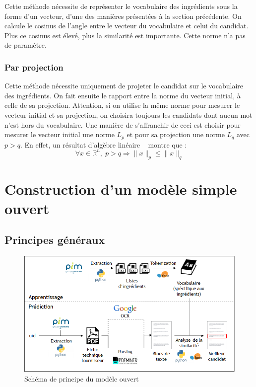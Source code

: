             Cette méthode nécessite de représenter le vocabulaire des ingrédients sous la forme d'un vecteur, d'une des manières présentées à la section précédente.
            On calcule le cosinus de l'angle entre le vecteur du vocabulaire et celui du candidat.
            Plus ce cosinus est élevé, plus la similarité est importante.
            Cette norme n'a pas de paramètre.

            \subsection{Par projection}

            Cette méthode nécessite uniquement de projeter le candidat sur le vocabulaire des ingrédients.
            On fait ensuite le rapport entre la norme du vecteur initial, à celle de sa projection.
            Attention, si on utilise la même norme pour mesurer le vecteur initial et sa projection, on choisira toujours les candidats dont aucun mot n'est hors du vocabulaire.
            Une manière de s'affranchir de ceci est choisir pour mesurer le vecteur initial une norme $L_{p}$ et pour sa projection une norme $L_{q}$ avec $p > q$.
            En effet, un résultat d'algèbre linéaire ~\cite{lpnorms} montre que :
            \[\forall x \in \mathbb{R}^{n}, \; p > q \Rightarrow \lVert x \rVert_{p} \leqslant \lVert x \rVert_{q}\]


    \chapter{Construction d'un modèle simple \og ouvert \fg}
        
        \section{Principes généraux}

            \begin{figure}[htbp]
                \begin{center}
                \includegraphics[width=0.9\linewidth]{img/open_model.png}
                \end{center}
                \caption{Schéma de principe du \og modèle ouvert \fg}
                \label{fig:open_model}
            \end{figure}     

